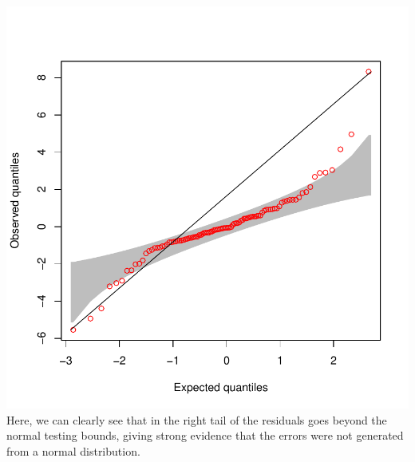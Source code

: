 \documentclass[article]{jss}
\begin{document}
\includegraphics{manuscript-qqconf_qqplot}
%
%
\newline
Here, we can clearly see that in the right tail of the residuals goes beyond the normal testing bounds, giving strong evidence that the errors were not generated from a normal distribution. 
\end{document}
